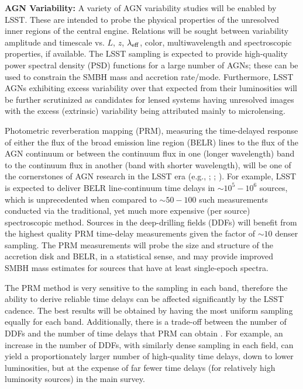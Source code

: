 {\bf AGN Variability:} A variety of AGN variability studies will be
enabled by LSST. These are intended to probe the physical properties
of the unresolved inner regions of the central engine. Relations will
be sought between variability amplitude and timescale vs. $L$, $z$,
$\lambda_{\rm eff}$, color, multiwavelength and spectroscopic
properties, if available. The LSST sampling is expected to provide
high-quality power spectral density (PSD) functions for a large number
of AGNs; these can be used to constrain the SMBH mass and accretion
rate/mode. Furthermore, LSST AGNs exhibiting excess variability over
that expected from their luminosities will be further scrutinized as
candidates for lensed systems having unresolved images with the excess
(extrinsic) variability being attributed mainly to microlensing.

Photometric reverberation mapping (PRM), measuring the time-delayed
response of either the flux of the broad emission line region (BELR)
lines to the flux of the AGN continuum or between the continuum flux
in one (longer wavelength) band to the continuum flux in another
(band with shorter wavelength), will be one of the cornerstones of
AGN research in the LSST era (e.g., \citet{Chelouche2013};
\citet{CheloucheandZucker2013}; \citet{CheloucheEtal2014}). For
example, LSST is expected to deliver BELR line-continuum time delays
in $\sim10^5-10^6$ sources, which is unprecedented when compared to
$\sim50-100$ such measurements conducted via the traditional, yet
much more expensive (per source) spectroscopic method. Sources in
the deep-drilling fields (DDFs) will benefit from the highest quality
PRM time-delay measurements given the factor of $\sim10$ denser
sampling. The PRM measurements will probe the size and structure of
the accretion disk and BELR, in a statistical sense, and may provide
improved SMBH mass estimates for sources that have at least
single-epoch spectra.

The PRM method is very sensitive to the sampling in each band,
therefore the ability to derive reliable time delays can be affected
significantly by the LSST cadence. The best results will be obtained
by having the most uniform sampling equally for each band.
Additionally, there is a trade-off between the number of DDFs and
the number of time delays that PRM can obtain \citep{CheloucheEtal2014}.
For example, an increase in the number of DDFs, with similarly dense
sampling in each field, can yield a proportionately larger number of
high-quality time delays, down to lower luminosities, but at the
expense of far fewer time delays (for relatively high luminosity
sources) in the main survey.

